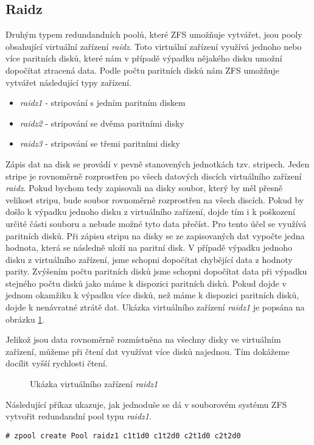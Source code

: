 \subsection{Raidz}
Druhým typem redundandních poolů, které ZFS umožňuje vytvářet, jsou pooly obsahující virtuální zařízení \emph{raidz}. Toto virtuální zařízení využívá jednoho nebo více paritních disků, které nám v případě výpadku nějakého disku umožní dopočítat ztracená data. Podle počtu paritních disků nám ZFS umožňuje vytvářet následující typy zařízení.
\begin{itemize}
  \item \emph{raidz1} - stripování s jedním paritním diskem
  \item \emph{raidz2} - stripování se dvěma paritními disky
  \item \emph{raidz3} - stripování se třemi paritními disky
\end{itemize}

Zápis dat na disk se provádí v pevně stanovených jednotkách tzv. stripech. Jeden stripe je rovnoměrně rozprostřen po všech datových discích virtuálního zařízení \emph{raidz}. Pokud bychom tedy zapisovali na disky soubor, který by měl přesně velikost stripu, bude soubor rovnoměrně rozprostřen na všech discích. Pokud by došlo k výpadku jednoho disku z virtuálního zařízení, dojde tím i k poškození určité části souboru a nebude možné tyto data přečíst. Pro tento účel se využívá paritních disků. Při zápisu stripu na disky se ze zapisovaných dat vypočte jedna hodnota, která se následně uloží na paritní disk. V případě výpadku jednoho disku z virtuálního zařízení, jsme schopni dopočítat chybějící data z hodnoty parity. Zvýšením počtu paritních disků jsme schopni dopočítat data při výpadku stejného počtu disků jako máme k dispozici paritních disků.
Pokud dojde v jednom okamžiku k výpadku více disků, než máme k dispozici paritních disků, dojde k nenávratné ztrátě dat. Ukázka virtuálního zařízení \emph{raidz1} je popsána na obrázku \ref{raidz}.

Jelikož jsou data rovnoměrně rozmístněna na všechny disky ve virtuálním zařízení, můžeme při čtení dat využívat více disků najednou. Tím dokážeme docílit vyšší rychlosti čtení.

\begin{figure}
  \centering 
  \label{raidz} 
  \caption{Ukázka virtuálního zařízení \emph{raidz1}}
\end{figure}

Následující příkaz ukazuje, jak jednoduše se dá v souborovém systému ZFS vytvořit redundandní pool typu \emph{raidz1}.
\begin{verbatim}
# zpool create Pool raidz1 c1t1d0 c1t2d0 c2t1d0 c2t2d0
\end{verbatim}

